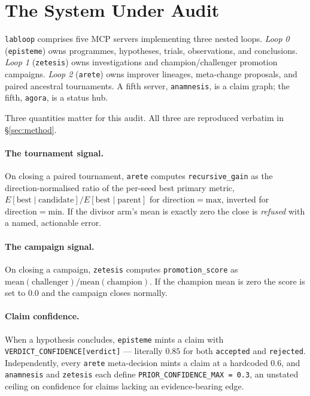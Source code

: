 \documentclass[10pt,twocolumn,letterpaper]{article}
\newcommand{\code}[1]{\texttt{#1}}
\begin{document}
\section{The System Under Audit}
\label{sec:system}

\code{labloop} comprises five MCP servers implementing three nested loops. \emph{Loop 0}
(\code{episteme}) owns programmes, hypotheses, trials, observations, and conclusions. \emph{Loop 1}
(\code{zetesis}) owns investigations and champion/challenger promotion campaigns. \emph{Loop 2}
(\code{arete}) owns improver lineages, meta-change proposals, and paired ancestral tournaments. A
fifth server, \code{anamnesis}, is a claim graph; the fifth, \code{agora}, is a status hub.

Three quantities matter for this audit. All three are reproduced verbatim in \S\ref{sec:method}.

\paragraph{The tournament signal.} On closing a paired tournament, \code{arete} computes
\code{recursive\_gain} as the direction-normalised ratio of the per-seed best primary metric,
$E[\mathrm{best} \mid \mathrm{candidate}] / E[\mathrm{best} \mid \mathrm{parent}]$ for
$\mathrm{direction} = \mathrm{max}$, inverted for $\mathrm{direction} = \mathrm{min}$. If the
divisor arm's mean is exactly zero the close is \emph{refused} with a named, actionable error.

\paragraph{The campaign signal.} On closing a campaign, \code{zetesis} computes
\code{promotion\_score} as $\mathrm{mean}(\mathrm{challenger}) / \mathrm{mean}(\mathrm{champion})$.
If the champion mean is zero the score is set to $0.0$ and the campaign closes normally.

\paragraph{Claim confidence.} When a hypothesis concludes, \code{episteme} mints a claim with
\code{VERDICT\_CONFIDENCE[verdict]} --- literally $0.85$ for both \code{accepted} and
\code{rejected}. Independently, every \code{arete} meta-decision mints a claim at a hardcoded
$0.6$, and \code{anamnesis} and \code{zetesis} each define
\code{PRIOR\_CONFIDENCE\_MAX = 0.3}, an unstated ceiling on confidence for claims lacking an
evidence-bearing edge.
\end{document}
